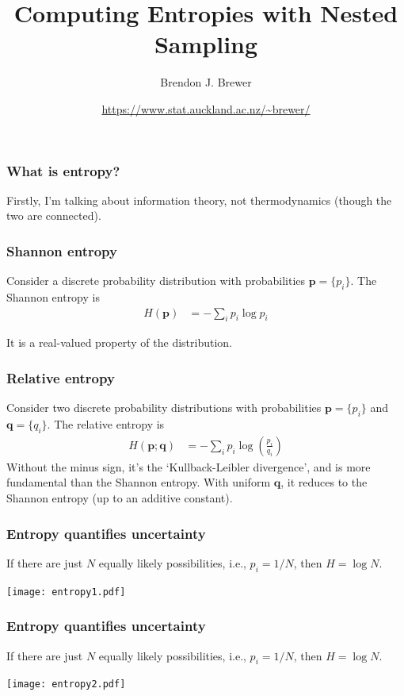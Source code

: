 \documentclass{beamer}
\title{Computing Entropies with Nested Sampling}
\author{Brendon J. Brewer}
\institute{Department of Statistics\\
The University of Auckland}
\date{\color{blue}\url{https://www.stat.auckland.ac.nz/~brewer/}}
\begin{document}
\frame{\titlepage}


\begin{frame}
\frametitle{What is entropy?}

Firstly, I'm talking about information theory, not thermodynamics (though the
two are connected).

\end{frame}


\begin{frame}
\frametitle{Shannon entropy}

Consider a discrete probability distribution with probabilities
$\boldsymbol{p} = \{p_i\}$. The Shannon entropy is
\begin{align}
H(\boldsymbol{p}) &= -\sum_i p_i \log p_i
\end{align}

It is a real-valued property of the distribution.

\end{frame}



\begin{frame}
\frametitle{Relative entropy}

Consider two discrete probability distributions with probabilities
$\boldsymbol{p} = \{p_i\}$ and $\boldsymbol{q} = \{q_i\}$.
The relative entropy is
\begin{align}
H(\boldsymbol{p}; \boldsymbol{q}) &= -\sum_i p_i \log\left(\frac{p_i}{q_i}\right)
\end{align}
Without the minus sign,
it's the `Kullback-Leibler divergence', and is more fundamental than the
Shannon entropy. With uniform $\boldsymbol{q}$, it reduces to the Shannon
entropy (up to an additive constant).
\end{frame}


\begin{frame}
\frametitle{Entropy quantifies uncertainty}
If there are just $N$ equally likely possibilities,
i.e., $p_i = 1/N$, then $H = \log N$. \vspace{0.5em}

\begin{center}
\texttt{[image: entropy1.pdf]}
\end{center}

\end{frame}


\begin{frame}
\frametitle{Entropy quantifies uncertainty}
If there are just $N$ equally likely possibilities,
i.e., $p_i = 1/N$, then $H = \log N$. \vspace{0.5em}

\begin{center}
\texttt{[image: entropy2.pdf]}
\end{center}

\end{frame}
\end{document}
